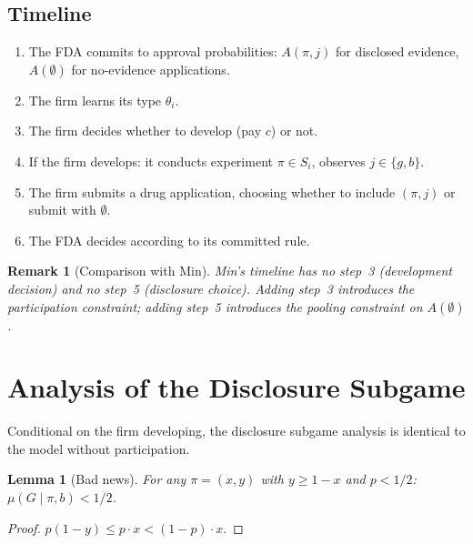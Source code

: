 \documentclass[12pt,a4paper]{article}
\newtheorem{lemma}{Lemma}
\newtheorem{remark}{Remark}
\begin{document}
\subsection{Timeline}
\label{sec:timeline}

\begin{enumerate}
  \item The FDA commits to approval probabilities:
    $A(\pi, j)$ for disclosed evidence, $A(\emptyset)$ for
    no-evidence applications.
  \item The firm learns its type $\theta_i$.
  \item The firm decides whether to develop (pay $c$) or
    not.
  \item If the firm develops: it conducts experiment
    $\pi \in S_i$, observes $j \in \{g, b\}$.
  \item The firm submits a drug application, choosing
    whether to include $(\pi, j)$ or submit with
    $\emptyset$.
  \item The FDA decides according to its committed rule.
\end{enumerate}

\begin{remark}[Comparison with Min]
Min's timeline has no step~3 (development decision) and no
step~5 (disclosure choice). Adding step~3 introduces the
participation constraint; adding step~5 introduces the
pooling constraint on $A(\emptyset)$.
\end{remark}


\section{Analysis of the Disclosure Subgame}
\label{sec:disclosure}

Conditional on the firm developing, the disclosure subgame
analysis is identical to the model without participation.

\begin{lemma}[Bad news]\label{lem:bad_news}
For any $\pi = (x,y)$ with $y \geq 1 - x$ and $p < 1/2$:
$\mu(G \mid \pi, b) < 1/2$.
\end{lemma}

\begin{proof}
$p(1-y) \leq p \cdot x < (1-p) \cdot x$.
\end{proof}
\end{document}
